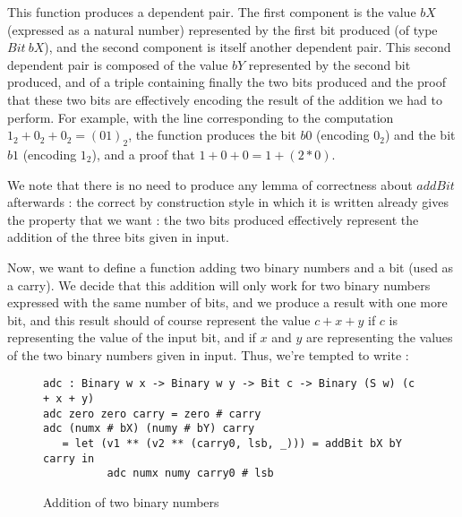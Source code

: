 This function produces a dependent pair. The first component is the value $bX$ (expressed as a natural number) represented by the first bit produced (of type $Bit\ bX$), and the second component is itself another dependent pair. This second dependent pair is composed of the value $bY$ represented by the second bit produced, and of a triple containing finally the two bits produced and the proof that these two bits are effectively encoding the result of the addition we had to perform.
For example, with the line corresponding to the computation $1_2 + 0_2 + 0_2 = (01)_2$, the function produces the bit $b0$ (encoding $0_2$) and the bit $b1$ (encoding $1_2$), and a proof that $1 + 0 + 0 = 1 + (2*0)$.

We note that there is no need to produce any lemma of correctness about $addBit$ afterwards : the correct by construction style in which it is written already gives the property that we want : the two bits produced effectively represent the addition of the three bits given in input.

Now, we want to define a function adding two binary numbers and a bit (used as a carry). We decide that this addition will only work for two binary numbers expressed with the same number of bits, and we produce a result with one more bit, and this result should of course represent the value $c + x + y$ if $c$ is representing the value of the input bit, and if $x$ and $y$ are representing the values of the two binary numbers given in input. Thus, we're tempted to write :
\begin{figure}[H]
\figrule
\begin{center}
\begin{verbatim}
adc : Binary w x -> Binary w y -> Bit c -> Binary (S w) (c + x + y)
adc zero zero carry = zero # carry
adc (numx # bX) (numy # bY) carry
   = let (v1 ** (v2 ** (carry0, lsb, _))) = addBit bX bY carry in
          adc numx numy carry0 # lsb
\end{verbatim}
\end{center}
\caption{Addition of two binary numbers}
\figrule
\end{figure}

